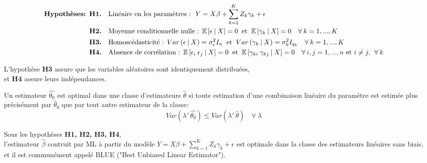 \documentclass[12pt,fleqn]{book} %
\begin{document}
\begin{align*}
\textbf{Hypothèses: } &\textbf{H1.} \quad \textnormal{Linéaire en les paramètres : }\: Y=X\beta+\sum_{k=1}^{K} Z_k \gamma_k+\epsilon \\
&\textbf{H2.} \quad \textnormal{Moyenne conditionnelle nulle : } \mathbb{E}\left[\epsilon\:|\:X\right]=0\:\textnormal{ et }\: \mathbb{E}\left[\gamma_{k}\:|\:X\right]=0  \quad \forall\: k=1,...,K\\ 
&\textbf{H3.} \quad \textnormal{Homoscédasticité : }  Var\left(\epsilon\:|\:X\right)=\sigma_{\epsilon}^2 I_n  \:\textnormal{ et }\: Var\left(\gamma_{k}\:|\:X\right)=\sigma_k^2 I_{q_k}  \quad \forall\: k=1,...,K\\ 
&\textbf{H4.} \quad \textnormal{Absence de corrélation : }   \mathbb{E}\left[\epsilon_{i}\:\epsilon_{j}\:|\:X\right]=0 \:\textnormal{ et }\: \mathbb{E}\left[\gamma_{ki}\:\gamma_{kj}\:|\:X\right]=0  \quad \forall\: i,j=1,...,n \textnormal{ et } i\neq j,\:\: \forall\: k 
\end{align*}

\begin{remark}
L'hypothèse \textbf{H3} assure que les variables aléatoires sont identiquement distribuées,\\ et \textbf{H4} assure leurs indépendances.
\end{remark}

\vspace{1em}

\begin{definition}
Un estimateur $\hat{\theta_0}$ est optimal dans une classe d'estimateurs $\hat{\theta}$ si toute estimation d'une combinaison linéaire du paramètre est estimée plus précisément par $\hat{\theta}_0$ que par tout autre estimateur de la classe:
\[
Var(\lambda'\:\hat{\theta_0})\leq Var(\lambda'\:\hat{\theta}) \quad \forall\:\lambda
\]
\end{definition}

\vspace{2em}

\begin{theorem}
Sous les hypothèses \textbf{H1, H2, H3, H4},\\ 
l'estimateur $\hat{\beta}$ contruit par ML à partir du modèle $Y=X\beta+\sum_{k=1}^{K} Z_k \gamma_k +\epsilon$ est optimale dans la classe des estimateurs linéaires sans biais, et il est communément appelé BLUE ("Best Unbiased Linear Estimator").
\end{theorem}
\end{document}
